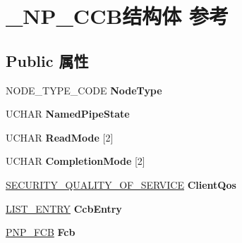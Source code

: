 \hypertarget{struct___n_p___c_c_b}{}\section{\+\_\+\+N\+P\+\_\+\+C\+C\+B结构体 参考}
\label{struct___n_p___c_c_b}
\subsection*{Public 属性}
\begin{DoxyCompactItemize}
\item 
\mbox{\label{struct___n_p___c_c_b_a22fb35fce702b91e1cbd9cb31c4177e3}} 
N\+O\+D\+E\+\_\+\+T\+Y\+P\+E\+\_\+\+C\+O\+DE {\bfseries Node\+Type}
\item 
\mbox{\label{struct___n_p___c_c_b_aba8742154315d9ec6ae58857f378b47e}} 
U\+C\+H\+AR {\bfseries Named\+Pipe\+State}
\item 
\mbox{\label{struct___n_p___c_c_b_a8d04c4f52d27491eda2de44ca0e50f4a}} 
U\+C\+H\+AR {\bfseries Read\+Mode} \mbox{[}2\mbox{]}
\item 
\mbox{\label{struct___n_p___c_c_b_a45690646435ba36e7bfd2dd5cf139559}} 
U\+C\+H\+AR {\bfseries Completion\+Mode} \mbox{[}2\mbox{]}
\item 
\mbox{\label{struct___n_p___c_c_b_ae133fb2983ccf6ef9b4d9d9103bbca13}} 
\hyperlink{struct___s_e_c_u_r_i_t_y___q_u_a_l_i_t_y___o_f___s_e_r_v_i_c_e}{S\+E\+C\+U\+R\+I\+T\+Y\+\_\+\+Q\+U\+A\+L\+I\+T\+Y\+\_\+\+O\+F\+\_\+\+S\+E\+R\+V\+I\+CE} {\bfseries Client\+Qos}
\item 
\mbox{\label{struct___n_p___c_c_b_a0c86a5baa7ddeb80ec236248d4fcf444}} 
\hyperlink{struct___l_i_s_t___e_n_t_r_y}{L\+I\+S\+T\+\_\+\+E\+N\+T\+RY} {\bfseries Ccb\+Entry}
\item 
\mbox{\label{struct___n_p___c_c_b_a0fed82e89359c412a6b32cb39d5db6d9}} 
\hyperlink{struct___n_p___f_c_b}{P\+N\+P\+\_\+\+F\+CB} {\bfseries Fcb}
\item 
\mbox{\label{struct___n_p___c_c_b_a04cad1aa8d76d5e50bd50ee312ac70a6}} 

\end{DoxyCompactItemize}
